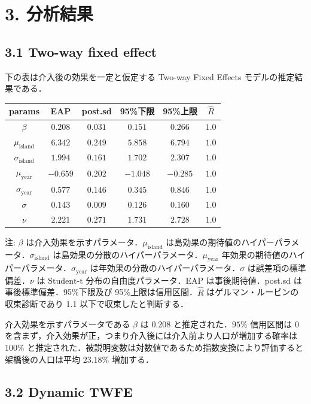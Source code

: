 \hypertarget{ux5206ux6790ux7d50ux679c}{%
\section{3. 分析結果}\label{ux5206ux6790ux7d50ux679c}}

\hypertarget{two-way-fixed-effect}{%
\subsection{3.1 Two-way fixed effect}\label{two-way-fixed-effect}}

下の表は介入後の効果を一定と仮定する Two-way Fixed Effects
モデルの推定結果である．

\begin{longtable}[]{@{}cccccc@{}}
\toprule
params & EAP & post.sd & 95\%下限 & 95\%上限 &
\(\hat{R}\)\tabularnewline
\midrule
\endhead
\(\beta\) & \(0.208\) & \(0.031\) & \(0.151\) & \(0.266\) &
\(1.0\)\tabularnewline
\(\mu_{\text{island}}\) & \(6.342\) & \(0.249\) & \(5.858\) & \(6.794\)
& \(1.0\)\tabularnewline
\(\sigma_{\text{island}}\) & \(1.994\) & \(0.161\) & \(1.702\) &
\(2.307\) & \(1.0\)\tabularnewline
\(\mu_{\text{year}}\) & \(-0.659\) & \(0.202\) & \(-1.048\) & \(-0.285\)
& \(1.0\)\tabularnewline
\(\sigma_{\text{year}}\) & \(0.577\) & \(0.146\) & \(0.345\) & \(0.846\)
& \(1.0\)\tabularnewline
\(\sigma\) & \(0.143\) & \(0.009\) & \(0.126\) & \(0.160\) &
\(1.0\)\tabularnewline
\(\nu\) & \(2.221\) & \(0.271\) & \(1.731\) & \(2.728\) &
\(1.0\)\tabularnewline
\bottomrule
\end{longtable}

注: \(\beta\) は介入効果を示すパラメータ．\(\mu_{\text{island}}\)
は島効果の期待値のハイパーパラメータ．\(\sigma_{\text{island}}\)
は島効果の分散のハイパーパラメータ．\(\mu_{\text{year}}\)
年効果の期待値のハイパーパラメータ．\(\sigma_{\text{year}}\)
は年効果の分散のハイパーパラメータ．\(\sigma\)
は誤差項の標準偏差．\(\nu\) は \(\text{Student-t}\)
分布の自由度パラメータ．EAP は事後期待値．post.sd
は事後標準偏差．95\%下限及び 95\%上限は信用区間．\(\hat{R}\)
はゲルマン・ルービンの収束診断であり 1.1 以下で収束したと判断する．

介入効果を示すパラメータである \(\beta\) は \(0.208\)
と推定された．\(95\%\) 信用区間は \(0\)
を含まず，介入効果が正，つまり介入後には介入前より人口が増加する確率は
\(100\%\)
と推定された．被説明変数は対数値であるため指数変換により評価すると架橋後の人口は平均
\(23.18\%\) 増加する．

\hypertarget{dynamic-twfe-1}{%
\subsection{3.2 Dynamic TWFE}\label{dynamic-twfe-1}}

